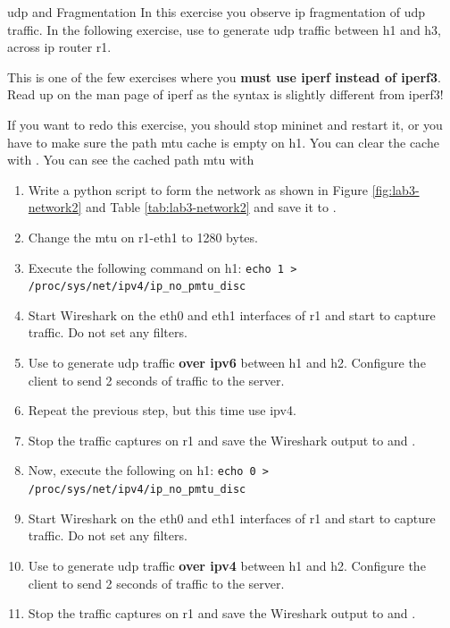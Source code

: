 \begin{exercise}{\acs{udp} and Fragmentation}
In this exercise you observe \acs{ip} fragmentation of \ac{udp} traffic. In the following exercise, use  to generate \ac{udp} traffic between h1 and h3, across \acs{ip} router r1.

\remark This is one of the few exercises where you \textbf{must use iperf instead of iperf3}. Read up on the man page of iperf as the syntax is slightly different from iperf3!

\remark If you want to redo this exercise, you should stop mininet and restart it, or you have to make sure the path \acs{mtu} cache is empty on h1. You can clear the cache with . You can see the cached path \acs{mtu} with 

\begin{enumerate}
	\item Write a python script to form the network as shown in Figure \ref{fig:lab3-network2} and Table \ref{tab:lab3-network2} and save it to .
	\item Change the \acs{mtu} on r1-eth1 to 1280 bytes.
	\item Execute the following command on h1: \verb!echo 1 > /proc/sys/net/ipv4/ip_no_pmtu_disc!
	\item Start Wireshark on the eth0 and eth1 interfaces of r1 and start to capture traffic. Do not set any filters.
	\item Use  to generate \ac{udp} traffic \textbf{over \acs{ipv6}} between h1 and h2. Configure the  client to send 2 seconds of traffic to the server.
	\item Repeat the previous step, but this time use \acs{ipv4}.
	\item Stop the traffic captures on r1 and save the Wireshark output to  and .
	\item Now, execute the following on h1: \verb!echo 0 > /proc/sys/net/ipv4/ip_no_pmtu_disc!
	\item Start Wireshark on the eth0 and eth1 interfaces of r1 and start to capture traffic. Do not set any filters.
	\item Use  to generate \ac{udp} traffic \textbf{over \acs{ipv4}} between h1 and h2. Configure the  client to send 2 seconds of traffic to the server.
	\item Stop the traffic captures on r1 and save the Wireshark output to  and .
\end{enumerate}


\end{exercise}
